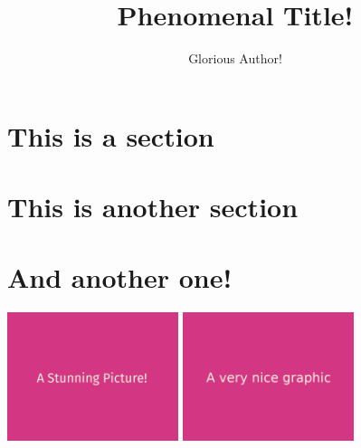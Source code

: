 \documentclass{fhnwfactsheet}
\title{Phenomenal Title!}
\author{Glorious Author!}
\begin{document}
\noindent\begin{minipage}{\pdfpagewidth}

\maketitle
\noindent\fbox{
    \begin{minipage}{\textwidth}
        \lipsum[1]
    \end{minipage}}
\lipsum[1-2]
\begin{multicols}{4}
    \section{This is a section}
    \lipsum[2]
    \section{This is another section}
    \lipsum[4]
    \section{And another one!}
    \lipsum[5]
\end{multicols}
\lipsum[1]

\includegraphics[width=5cm]{images/a-stunning-picture.png}
\includegraphics[width=5cm]{images/a-very-nice-graphic.png}

\end{minipage}
\end{document}
